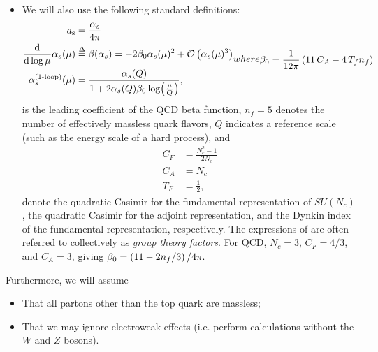 \begin{itemize}
    \item
        We will also use the following standard definitions:
        \begin{subequations}
        \label{eq:qcd_coupling}
        \begin{align}
            \label{eq:as_defn}
            \as &= \frac{\alpha_s}{4\pi}
            \\
            \label{eq:beta_fn_defn}
            \frac{\dd}{\dd\log\mu}\alpha_s(\mu)
            &\eqdelta
            \beta(\alpha_s)
            =
            -2\beta_0 \alpha_s(\mu)^2 + \mathcal{O}\le(\alpha_s(\mu)^3\ri)
            \\
            \label{eq:alphas_1loop}
            \alpha_s^\text{(1-loop)}(\mu)
            &=
            \frac{\alpha_s(Q)}{1 + 2\alpha_s(Q) \beta_0 \log(\frac{\mu}{Q})}
            ,
        \end{align}
        where
        \begin{align}
            \beta_0 = \frac{1}{12\pi}\le(11\,C_A - 4\,T_f n_f\ri)
        \end{align}
        \end{subequations}
        is the leading coefficient of the QCD beta function, \(n_f = 5\) denotes the number of effectively massless quark flavors, \(Q\) indicates a reference scale (such as the energy scale of a hard process), and
        \begin{subequations}
        \label{eq:group_theory}
        \begin{align}
            C_F &= \frac{N_c^2 - 1}{2N_c}
            \\
            C_A &= N_c
            \\
            T_F &= \frac{1}{2}
            ,
        \end{align}
        \end{subequations}
        denote the quadratic Casimir for the fundamental representation of \(SU(N_c)\), the quadratic Casimir for the adjoint representation, and the Dynkin index of the fundamental representation, respectively.
        The expressions of  are often referred to collectively as \textit{group theory factors}.
        For QCD, \(N_c = 3\), \(C_F = 4/3\), and \(C_A = 3\), giving \(
            \beta_0 = \left(11 - 2 n_f / 3\right)/4\pi
            .
        \)


\end{itemize}


Furthermore, we will assume
\begin{itemize}
    \item
    That all partons other than the top quark are massless;

    \item
    That we may ignore electroweak effects (i.e. perform calculations without the \(W\) and \(Z\) bosons).
\end{itemize}
